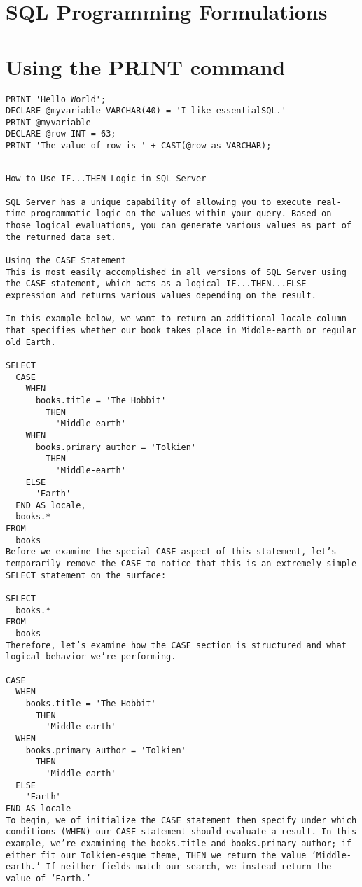 \newpage
\section {SQL Programming Formulations}

\section {Using the PRINT command}
\begin{lstlisting}[frame=single]
PRINT 'Hello World';
DECLARE @myvariable VARCHAR(40) = 'I like essentialSQL.'
PRINT @myvariable
DECLARE @row INT = 63;
PRINT 'The value of row is ' + CAST(@row as VARCHAR);
\end{lstlisting}

\begin{lstlisting}[frame=single]

How to Use IF...THEN Logic in SQL Server

SQL Server has a unique capability of allowing you to execute real-time programmatic logic on the values within your query. Based on those logical evaluations, you can generate various values as part of the returned data set.

Using the CASE Statement
This is most easily accomplished in all versions of SQL Server using the CASE statement, which acts as a logical IF...THEN...ELSE expression and returns various values depending on the result.

In this example below, we want to return an additional locale column that specifies whether our book takes place in Middle-earth or regular old Earth.

SELECT
  CASE
    WHEN
      books.title = 'The Hobbit'
        THEN
          'Middle-earth'
    WHEN
      books.primary_author = 'Tolkien'
        THEN
          'Middle-earth'
    ELSE
      'Earth'
  END AS locale,
  books.*
FROM
  books
Before we examine the special CASE aspect of this statement, let’s temporarily remove the CASE to notice that this is an extremely simple SELECT statement on the surface:

SELECT
  books.*
FROM
  books
Therefore, let’s examine how the CASE section is structured and what logical behavior we’re performing.

CASE
  WHEN
    books.title = 'The Hobbit'
      THEN
        'Middle-earth'
  WHEN
    books.primary_author = 'Tolkien'
      THEN
        'Middle-earth'
  ELSE
    'Earth'
END AS locale
To begin, we of initialize the CASE statement then specify under which conditions (WHEN) our CASE statement should evaluate a result. In this example, we’re examining the books.title and books.primary_author; if either fit our Tolkien-esque theme, THEN we return the value ‘Middle-earth.’ If neither fields match our search, we instead return the value of ‘Earth.’


\end{lstlisting}
